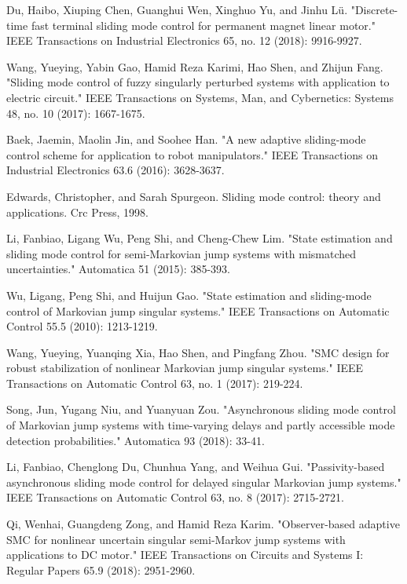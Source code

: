\documentclass[conference]{IEEEtran}
\begin{document}
\begin{thebibliography}{1}
	
	Du, Haibo, Xiuping Chen, Guanghui Wen, Xinghuo Yu, and Jinhu Lü. "Discrete-time fast terminal sliding mode control for permanent magnet linear motor." IEEE Transactions on Industrial Electronics 65, no. 12 (2018): 9916-9927.
	
	Wang, Yueying, Yabin Gao, Hamid Reza Karimi, Hao Shen, and Zhijun Fang. "Sliding mode control of fuzzy singularly perturbed systems with application to electric circuit." IEEE Transactions on Systems, Man, and Cybernetics: Systems 48, no. 10 (2017): 1667-1675.
	
	Baek, Jaemin, Maolin Jin, and Soohee Han. "A new adaptive sliding-mode control scheme for application to robot manipulators." IEEE Transactions on Industrial Electronics 63.6 (2016): 3628-3637.
	
	Edwards, Christopher, and Sarah Spurgeon. Sliding mode control: theory and applications. Crc Press, 1998.
	
	Li, Fanbiao, Ligang Wu, Peng Shi, and Cheng-Chew Lim. "State estimation and sliding mode control for semi-Markovian jump systems with mismatched uncertainties." Automatica 51 (2015): 385-393.
	
	Wu, Ligang, Peng Shi, and Huijun Gao. "State estimation and sliding-mode control of Markovian jump singular systems." IEEE Transactions on Automatic Control 55.5 (2010): 1213-1219.
	
	Wang, Yueying, Yuanqing Xia, Hao Shen, and Pingfang Zhou. "SMC design for robust stabilization of nonlinear Markovian jump singular systems." IEEE Transactions on Automatic Control 63, no. 1 (2017): 219-224.
	
	Song, Jun, Yugang Niu, and Yuanyuan Zou. "Asynchronous sliding mode control of Markovian jump systems with time-varying delays and partly accessible mode detection probabilities." Automatica 93 (2018): 33-41.

	Li, Fanbiao, Chenglong Du, Chunhua Yang, and Weihua Gui. "Passivity-based asynchronous sliding mode control for delayed singular Markovian jump systems." IEEE Transactions on Automatic Control 63, no. 8 (2017): 2715-2721.
	
	Qi, Wenhai, Guangdeng Zong, and Hamid Reza Karim. "Observer-based adaptive SMC for nonlinear uncertain singular semi-Markov jump systems with applications to DC motor." IEEE Transactions on Circuits and Systems I: Regular Papers 65.9 (2018): 2951-2960.
	

\end{thebibliography}
\end{document}
